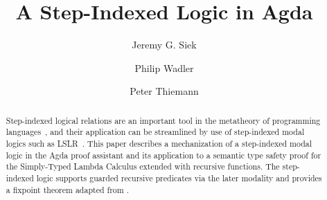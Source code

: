 \documentclass[acmsmall]{acmart}
\begin{document}
\title{A Step-Indexed Logic in Agda}

\author{Jeremy G. Siek}

\author{Philip Wadler}

\author{Peter Thiemann}


\begin{abstract}
  Step-indexed logical relations are an important tool in the
  metatheory of programming
  languages~\citep{Appel:2001aa,Ahmed:2006aa}, and their application
  can be streamlined by use of step-indexed modal logics such as
  LSLR~\citep{Dreyer:2011wl}.  This paper describes a mechanization of
  a step-indexed modal logic in the Agda proof assistant and its
  application to a semantic type safety proof for the Simply-Typed
  Lambda Calculus extended with recursive functions. The step-indexed
  logic supports guarded recursive predicates via the later modality
  and provides a fixpoint theorem adapted from \citet{Appel:2001aa}.
\end{abstract}


\end{document}

